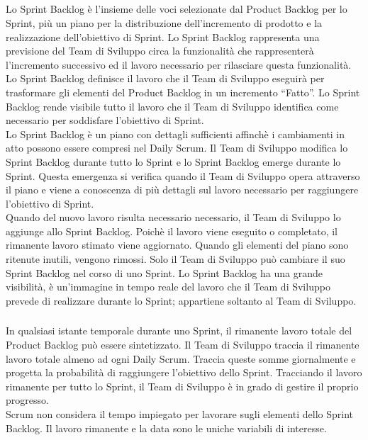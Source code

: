 \subsection*{\color{SteelBlue}{Sprint Backlog}}
\label{sec:sprint_backlog}
Lo Sprint Backlog \`e l'insieme delle voci selezionate dal Product Backlog per lo Sprint, 
pi\`u un piano per la distribuzione dell'incremento di prodotto e la realizzazione 
dell'obiettivo di Sprint. Lo Sprint Backlog rappresenta una previsione del Team di 
Sviluppo circa la funzionalità che rappresenter\`a  l'incremento successivo ed il lavoro 
necessario per rilasciare questa funzionalit\`a. \newline
\\ Lo Sprint Backlog definisce il lavoro che il Team di Sviluppo eseguir\`a per 
trasformare gli elementi del Product Backlog in un incremento ``Fatto''. Lo Sprint Backlog rende visibile tutto il 
lavoro che il Team di Sviluppo identifica come necessario per soddisfare l'obiettivo di Sprint. \newline
\\Lo Sprint Backlog \`e un piano con dettagli sufficienti affinch\`e i cambiamenti in atto 
possono essere compresi nel Daily Scrum. Il Team di Sviluppo modifica lo Sprint Backlog 
durante tutto lo Sprint e lo Sprint Backlog emerge durante lo Sprint. Questa emergenza si 
verifica quando il Team di Sviluppo opera attraverso il piano e viene a conoscenza di 
pi\`u dettagli sul lavoro necessario per raggiungere l'obiettivo di Sprint. \newline
\\Quando del nuovo lavoro risulta necessario necessario, il Team di Sviluppo lo aggiunge allo Sprint 
Backlog. Poich\`e il lavoro viene eseguito o completato, il rimanente lavoro stimato viene 
aggiornato. Quando gli elementi del piano sono ritenute inutili, vengono rimossi. Solo il 
Team di Sviluppo pu\`o cambiare il suo Sprint Backlog nel corso di uno Sprint. Lo Sprint 
Backlog ha una grande visibilit\`a, \`e un'immagine in tempo reale del lavoro che il Team 
di Sviluppo prevede di realizzare durante lo Sprint; appartiene soltanto al Team di Sviluppo.

\subsubsection*{\color{SteelBlue}{Monitorare i Progressi dello Sprint}} %
\label{ssub:monitoring_sprint_progress}
In qualsiasi istante temporale durante uno Sprint, il rimanente lavoro totale del Product Backlog 
pu\`o essere sintetizzato. Il Team di Sviluppo traccia il rimanente lavoro totale almeno 
ad ogni Daily Scrum. Traccia queste somme giornalmente e progetta la probabilit\`a di 
raggiungere l'obiettivo dello Sprint. Tracciando il lavoro rimanente per tutto lo Sprint, 
il Team di Sviluppo \`e in grado di gestire il proprio progresso. \newline
\\Scrum non considera il tempo impiegato per lavorare sugli elementi dello Sprint Backlog. 
Il lavoro rimanente e la data sono le uniche variabili di interesse. 

